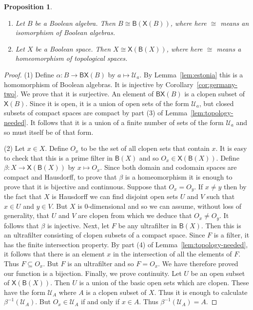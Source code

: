 \documentclass[a4paper]{amsart}
\newtheorem{proposition}[theorem]{Proposition}
\begin{document}
\begin{proposition}\label{prop:big-theorem}\mbox{}
\begin{enumerate}

\item Let $B$ be a Boolean algebra.
Then $B \cong \mathsf{B} (\mathsf{X}(B))$, where here $\cong$ means an isomorphism of Boolean algebras.

\item Let $X$ be a Boolean space.
Then $X \cong \mathsf{X} (\mathsf{B}(X))$, where here $\cong$ means a homeomorphism of topological spaces.

\end{enumerate}
\end{proposition}
\begin{proof} (1) Define $\alpha \colon B \rightarrow \mathsf{B} \mathsf{X}(B)$ by $a \mapsto \mathscr{U}_{a}$.
By Lemma~\ref{lem:estonia} this is a homomorphism of Boolean algebras.
It is injective by Corollary~\ref{cor:germany-two}.
We prove that it is surjective.
An element of $\mathsf{B} \mathsf{X}(B)$ is a clopen subset of $\mathsf{X}(B)$.
Since it is open, it is a union of open sets of the form $\mathscr{U}_{a}$,
but closed subsets of compact spaces are compact by part (3) of Lemma~\ref{lem:topology-needed}.
It follows that it is a union of a finite number of sets of the form $\mathscr{U}_{a}$
and so must itself be of that form.  

(2) Let $x \in X$. Define $O_{x}$ to be the set of all clopen sets that contain $x$.
It is easy to check that this is a prime filter in $\mathsf{B}(X)$ and so $O_{x} \in \mathsf{X} (\mathsf{B}(X))$.
Define $\beta \colon X \rightarrow \mathsf{X} (\mathsf{B}(X))$ by $x \mapsto O_{x}$.
Since both domain and codomain spaces are compact and Hausdorff, to prove that $\beta$ is a homeomorphism it
is enough to prove that it is bijective and continuous.
Suppose that $O_{x} = O_{y}$.
If $x \neq y$ then by the fact that $X$ is Hausdorff we can find disjoint open sets $U$ and $V$ such that
$x \in U$ and $y \in V$.
But $X$ is $0$-dimensional and so we can assume, without loss of generality, that $U$ and $V$ are clopen
from which we deduce that $O_{x} \neq O_{y}$.
It follows that $\beta$ is injective.
Next, let $F$ be any ultrafilter in $\mathsf{B}(X)$.
Then this is an ultrafilter consisting of clopen subsets of a compact space.
Since $F$ is a filter, it has the finite intersection property.
By part (4) of Lemma~\ref{lem:topology-needed}, it follows that there is an element $x$ in the intersection of all the elements of $F$.
Thus $F \subseteq O_{x}$.
But $F$ is an ultrafilter and so $F = O_{x}$.
We have therefore proved our function is a bijection.
Finally, we prove continuity.
Let $U$ be an open subset of $\mathsf{X} (\mathsf{B}(X))$.
Then $U$ is a union of the basic open sets which are clopen.
These have the form $\mathscr{U}_{A}$ where $A$ is a clopen subset of $X$.
Thus it is enough to calculate $\beta^{-1}(\mathscr{U}_{A})$.
But $O_{x} \in \mathscr{U}_{A}$ if and only if $x \in A$.
Thus $\beta^{-1}(\mathscr{U}_{A}) = A$.
\end{proof}
\end{document}
